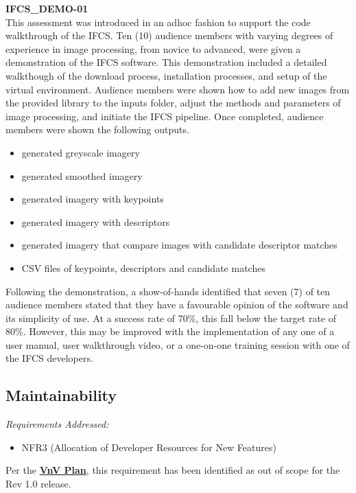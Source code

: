 \documentclass[12pt, titlepage]{article}
\begin{document}
\noindent\textbf{IFCS\_DEMO-01}\\
This assessment was introduced in an adhoc fashion to support the code walkthrough of the IFCS. Ten (10) audience members with varying degrees of experience in image processing, from novice to advanced, were given a demonstration of the IFCS software. This demonstration included a detailed walkthough of the download process, installation processes, and setup of the virtual environment. Audience members were shown how to add new images from the provided library to the inputs folder, adjust the methods and parameters of image processing, and initiate the IFCS pipeline. Once completed, audience members were shown the following outputs.
\begin{itemize}
  \item generated greyscale imagery
  \item generated smoothed imagery
  \item generated imagery with keypoints
  \item generated imagery with descriptors
  \item generated imagery that compare images with candidate descriptor matches
  \item CSV files of keypoints, descriptors and candidate matches
\end{itemize}
Following the demonstration, a show-of-hands identified that seven (7) of ten audience members stated that they have a favourable opinion of the software and its simplicity of use. At a success rate of 70\%, this fall below the target rate of 80\%. However, this may be improved with the implementation of any one of a user manual, user walkthrough video, or a one-on-one training session with one of the IFCS developers.

\subsection{Maintainability}
\textit{Requirements Addressed:} 
\begin{itemize}
\item NFR3 (Allocation of Developer Resources for New Features)
\end{itemize}
Per the \href{https://github.com/KiranSingh15/CAS-741-Image-Correspondences/blob/main/docs/VnVPlan/VnVPlan.pdf}{\textbf{VnV Plan}}, this requirement has been identified as out of scope for the Rev 1.0 release.
		
\end{document}
